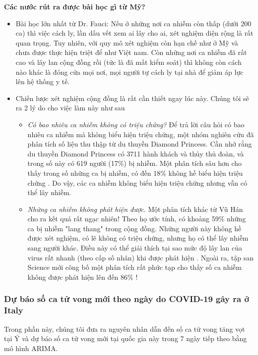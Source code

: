 \documentclass[12pt, a4paper,oneside]{book}
\theoremstyle{definition}
\begin{document}
\textbf{Các nước rút ra được bài học gì từ Mỹ?}\\
\begin{itemize}
    \item Bài học lớn nhất từ Dr. Fauci: Nếu ở những nơi ca nhiễm còn thấp (dưới 200 ca) thì việc cách ly, lần dấu vết xem ai lây cho ai, xét nghiệm diện rộng là rất quan trọng. Tuy nhiên, với quy mô xét nghiệm còn hạn chế như ở Mỹ và chưa được thực hiện triệt để như Việt nam. Còn những nơi ca nhiễm đã rất cao và lây lan cộng đồng rồi (tức là đã mất kiểm soát) thì không còn cách nào khác là đóng cửa mọi nơi, mọi người tự cách ly tại nhà để giảm áp lực lên hệ thống y tế.
   \item Chiến lược xét nghiệm cộng đồng là rất cần thiết ngay lúc này. Chúng tôi sẽ ra 2 lý do cho việc làm này như sau
\begin{itemize}
	\item \textit{Có bao nhiêu ca nhiễm không có triệu chứng?} Để trả lời câu hỏi có bao nhiêu ca nhiễm mà không biểu hiện triệu chứng, một nhóm nghiên cứu đã phân tích số liệu thu thập từ du thuyền Diamond Princess. Cần nhớ rằng du thuyền Diamond Princess có 3711 hành khách và thủy thủ đoàn, và trong số này có 619 người (17\%) bị nhiễm. Một phân tích sâu hơn cho thấy trong số những ca bị nhiễm, có đến 18\% không hề biểu hiện triệu chứng \cite{13}. Do vậy, các ca nhiễm không biểu hiện triệu chứng nhưng vẫn có thể lây nhiễm. 
	\item \textit{Những ca nhiễm không phát hiện được}. Một phân tích khác từ Vũ Hán cho ra kết quả rất ngạc nhiên! Theo họ ước tính, có khoảng 59\% những ca bị nhiễm "lang thang" trong cộng đồng. Những người này không hề được xét nghiệm, có lẽ không có triệu chứng, nhưng họ có thể lây nhiễm sang người khác. Điều này có thể giải thích tại sao mức độ lây lan của virus rất nhanh (theo cấp số nhân) khi được phát hiện \cite{14}. Ngoài ra, tập san Science mới công bố một phân tích rất phức tạp cho thấy số ca nhiễm không được phát hiện lên đến 86\% \cite{15}!
\end{itemize}
\end{itemize}
\subsubsection{Dự báo số ca tử vong mới theo ngày do COVID-19 gây ra ở Italy}
Trong phần này, chúng tôi đưa ra nguyên nhân dẫn đến số ca tử vong tăng vọt tại Ý và dự báo số ca tử vong mới tại quốc gia này trong 7 ngày tiếp theo bằng mô hình ARIMA.
\end{document}
